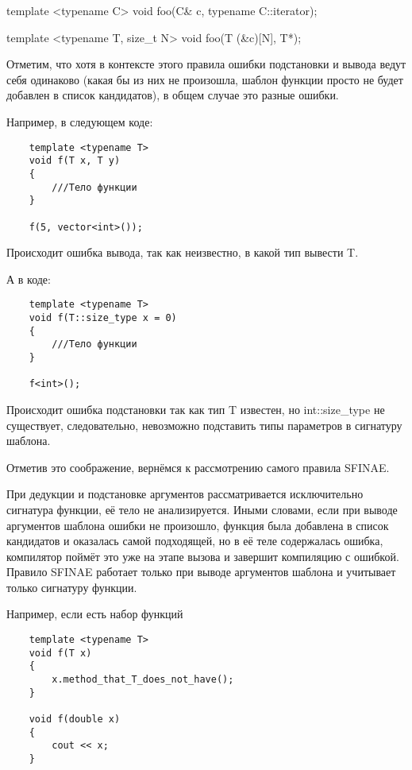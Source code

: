 	template <typename C>
    void foo(C& c, typename C::iterator);

    template <typename T, size_t N>
    void foo(T (&c)[N], T*);

	\vspace{\baselineskip}	
	
	Отметим, что хотя в контексте этого правила ошибки подстановки и вывода ведут себя одинаково (какая бы из них не произошла, шаблон функции просто не будет добавлен в список кандидатов), в общем случае это разные ошибки.
	
	Например, в следующем коде:
	
	\begin{verbatim}
	template <typename T>
	void f(T x, T y)
	{
	    ///Тело функции
	}
	
	f(5, vector<int>());
	\end{verbatim}
	
	Происходит ошибка вывода, так как неизвестно, в какой тип вывести T.
	
	А в коде:
	
	\begin{verbatim}
	template <typename T>
	void f(T::size_type x = 0)
	{
	    ///Тело функции
	}
	
	f<int>();
	\end{verbatim}
	
	Происходит ошибка подстановки так как тип T известен, но int::size\_type не существует, следовательно, невозможно подставить типы параметров в сигнатуру шаблона.
	
	Отметив это соображение, вернёмся к рассмотрению самого правила SFINAE.
	
	\vspace{\baselineskip}	
	
	При дедукции и подстановке аргументов рассматривается исключительно сигнатура функции, её тело не анализируется. Иными словами, если при выводе аргументов шаблона ошибки не произошло, функция была добавлена в список кандидатов и оказалась самой подходящей, но в её теле содержалась ошибка, компилятор поймёт это уже на этапе вызова и завершит компиляцию с ошибкой. Правило SFINAE работает только при выводе аргументов шаблона и учитывает только сигнатуру функции.

	Например, если есть набор функций

	\begin{verbatim}
	template <typename T>
	void f(T x)
	{
	    x.method_that_T_does_not_have();
	}

	void f(double x)
	{
	    cout << x;
	}
	\end{verbatim}
	
